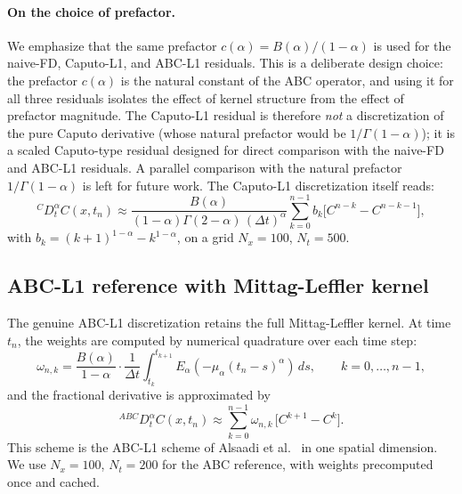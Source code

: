 \documentclass[11pt]{article}
\begin{document}
\paragraph{On the choice of prefactor.}
We emphasize that the same prefactor \(c(\alpha) = B(\alpha)/(1-\alpha)\) is used for the naive-FD, Caputo-L1, and ABC-L1 residuals. This is a deliberate design choice: the prefactor \(c(\alpha)\) is the natural constant of the ABC operator, and using it for all three residuals isolates the effect of kernel structure from the effect of prefactor magnitude. The Caputo-L1 residual is therefore \emph{not} a discretization of the pure Caputo derivative (whose natural prefactor would be \(1/\Gamma(1-\alpha)\)); it is a scaled Caputo-type residual designed for direct comparison with the naive-FD and ABC-L1 residuals. A parallel comparison with the natural prefactor \(1/\Gamma(1-\alpha)\) is left for future work. The Caputo-L1 discretization itself reads:
\begin{equation}
{}^{C}D_t^\alpha C(x,t_n) \approx \frac{B(\alpha)}{(1-\alpha)\Gamma(2-\alpha)\,(\Delta t)^\alpha}
\sum_{k=0}^{n-1} b_k \bigl[C^{n-k}-C^{n-k-1}\bigr],
\end{equation}
with \(b_k = (k+1)^{1-\alpha} - k^{1-\alpha}\), on a grid \(N_x=100\), \(N_t=500\).

\subsection{ABC-L1 reference with Mittag-Leffler kernel}
\label{sec:abc_ref}

The genuine ABC-L1 discretization retains the full Mittag-Leffler kernel. At time \(t_n\), the weights are computed by numerical quadrature over each time step:
\begin{equation}
\omega_{n,k} = \frac{B(\alpha)}{1-\alpha}\cdot\frac{1}{\Delta t}
\int_{t_k}^{t_{k+1}} E_\alpha\!\left(-\mu_\alpha (t_n-s)^\alpha\right)\,ds,
\qquad k = 0,\dots,n-1,
\label{eq:abc_weights}
\end{equation}
and the fractional derivative is approximated by
\begin{equation}
{}^{ABC}D_t^\alpha C(x,t_n) \approx \sum_{k=0}^{n-1} \omega_{n,k}\,\bigl[C^{k+1}-C^k\bigr].
\end{equation}
This scheme is the ABC-L1 scheme of Alsaadi et al.~\cite{Alsaadi2026} in one spatial dimension. We use \(N_x=100\), \(N_t=200\) for the ABC reference, with weights precomputed once and cached.
\end{document}
